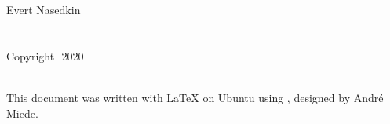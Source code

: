 
\thispagestyle{empty}

\hfill


\begin{center}
Evert Nasedkin \\
\smallskip
\textbf{\myTitle}\\
\textit{\mySubTitle}\\
\smallskip
Copyright\,\textcopyright\ 2020
\end{center}

\medskip

\noindent\textsf{} \\
\noindent
This document was written with \LaTeX{} on Ubuntu using \arsclassica, designed by Andr\'e Miede.

\bigskip

\noindent
\textsf{}

\noindent
{}\,